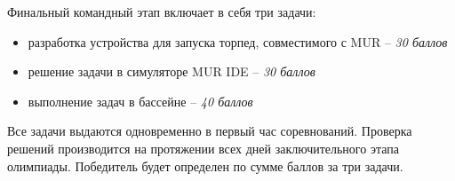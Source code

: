 Финальный командный этап включает в себя три задачи: 

\begin{itemize}
    \item разработка устройства для запуска торпед, совместимого с MUR – \textit{30 баллов}
    \item решение задачи в симуляторе MUR IDE – \textit{30 баллов}
    \item выполнение задач в бассейне – \textit{40 баллов}
\end{itemize}

Все задачи выдаются одновременно в первый час соревнований. Проверка решений производится на протяжении всех дней заключительного этапа олимпиады. Победитель будет определен по сумме баллов за три задачи.